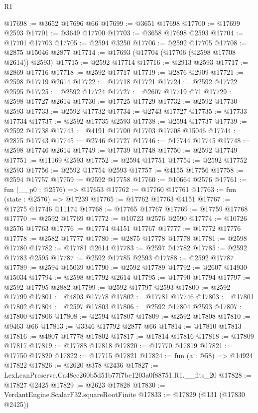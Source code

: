 \begin{lexlean}{R1}
\begin{coremodule}
@17698 := @3652 @17696 @66
@17699 := @3651 @17698
@17700 := @17699 @2593
@17701 := @3649 @17700
@17703 := @3658 @17698 @2593
@17704 := @17701 @17703
@17705 := @2594 @3250
@17706 := @2592 @17705
@17708 := @2875 @15046 @2877
@17714 := @17693 (@17704 (@17706 (@2598 @17708 @2614)) @2593)
@17715 := @2592 @17714
@17716 := @2913 @2593
@17717 := @2869 @17716
@17718 := @2592 @17717
@17719 := @2876 @2909
@17721 := @2598 @17719 @2614
@17722 := @17718 @17721
@17724 := @2592 @17722 @2595
@17725 := @2592 @17724
@17727 := @2607 @17719 @71
@17729 := @2598 @17727 @2614
@17730 := @17725 @17729
@17732 := @2592 @17730 @2593
@17733 := @2592 @17732
@17734 := @2743 @17727
@17735 := @17733 @17734
@17737 := @2592 @17735 @2593
@17738 := @2594 @17737
@17739 := @2592 @17738
@17743 := @4191 @17700 @17703 @17708 @15046
@17744 := @2875 @17743
@17745 := @2746 @17727
@17746 := @17744 @17745
@17748 := @2598 @17746 @2614
@17749 := @17739 @17748
@17750 := @2592 @17749
@17751 := @11169 @2593
@17752 := @2594 @17751
@17754 := @2592 @17752 @2593
@17756 := @2592 @17754 @2593
@17757 := @4155 @17756
@17758 := @2594 @17757
@17759 := @2592 @17758
@17760 := @10664 @2576
@17761 := fun (__p0 : @2576) => @17653
@17762 := @17760 @17761
@17763 := fun (state : @2576) => @17239
@17765 := @17762 @17763 @4151
@17767 := @17275 @17746 @11174
@17768 := @17765 @17767
@17769 := @17759 @17768
@17770 := @2592 @17769
@17772 := @10723 @2576 @2590
@17774 := @10726 @2576 @17763
@17776 := @17774 @4151 @17767
@17777 := @17772 @17776
@17778 := @2582 @17777
@17780 := @2875 @17778 @17778
@17781 := @2598 @17780
@17782 := @17781 @2614
@17783 := @2597 @17782
@17785 := @2592 @17783 @2595
@17787 := @2592 @17785 @2593
@17788 := @2592 @17787
@17789 := @2594 @15039
@17790 := @2592 @17789
@17792 := @2607 @14930 @15034
@17794 := @2598 @17792 @2614
@17795 := @17790 @17794
@17797 := @2592 @17795 @2882
@17799 := @2592 @17797 @2593
@17800 := @2592 @17799
@17801 := @4803 @17778
@17802 := @17781 @17746
@17803 := @17801 @17802
@17804 := @2597 @17803
@17806 := @2592 @17804 @2593
@17807 := @17800 @17806
@17808 := @2594 @17807
@17809 := @2592 @17808
@17810 := @9463 @66
@17813 := @3346 @17792 @2877 @66
@17814 := @17810 @17813
@17816 := @4807 @17778 @17802
@17817 := @17814 @17816
@17818 := @17809 @17817
@17819 := @17788 @17818
@17820 := @17770 @17819
@17821 := @17750 @17820
@17822 := @17715 @17821
@17824 := fun (a : @58) => @14924 @17822
@17826 := @2620 @378 @2436
@17827 := LexLeanPreserve.Ca48cc260b5d51b77f7be1203a0f88751.R1.__fits_20
@17828 := @17827 @2425
@17829 := @2623 @17828
@17830 := VerdantEngine.ScalarF32.squareRootFinite
@17833 := @17829 (@131 (@17830 @2425))

\end{coremodule}
\end{lexlean}
